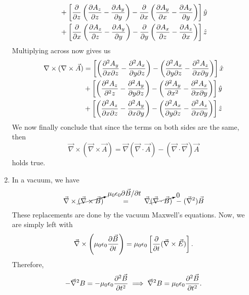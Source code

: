 \begin{sol}
\begin{enumerate}[label=\textbf{(\alph*)}]
\begin{align*}
    &+ \left[\pdv{}{z}\left(\pdv{A_z}{z} - \pdv{A_y}{y}\right) -\pdv{}{x}\left(\pdv{A_y}{x} - \pdv{A_x}{y}\right)\right]\hat{y} \\
    &+ \left[ \pdv{}{x}\left(\pdv{A_z}{z} - \pdv{A_y}{y}\right) - \pdv{}{y}\left(\pdv{A_x}{z} - \pdv{A_z}{x}\right) \right] \hat{z}
\end{align*}
Multiplying across now gives us 
\begin{align*}
    \nabla \times (\nabla \times \vec{A}) &= \left[\left(\pdv{^2 A_y}{x\partial z} - \pdv{^2 A_x}{y \partial z}\right) - \left(\pdv{^2 A_x}{y \partial z} - \pdv{^2 A_z}{x \partial y}\right)\right] \hat{x}\\
    &+ \left[\left(\pdv{^2 A_z}{^2 z} - \pdv{^2 A_y}{y \partial z}\right) -\left(\pdv{^2 A_y}{x^2} - \pdv{^2 A_x}{x \partial y}\right)\right]\hat{y} \\
    &+ \left[\left(\pdv{^2 A_z}{x \partial z} - \pdv{^2 A_y}{x \partial y}\right) - \left(\pdv{^2 A_x}{y \partial z} - \pdv{^2 A_z}{x \partial y}\right) \right] \hat{z}
\end{align*}
We now finally conclude that since the terms on both sides are the same, then 
\[\vec{\nabla}\times (\vec{\nabla} \times \vec{A}) = \vec{\nabla}(\vec{\nabla} \cdot \vec{A}) - (\vec{\nabla}\cdot \vec{\nabla}) \vec{A}\]
holds true.

\item In a vacuum, we have 
\[\vec{\nabla}\times\cancelto{\mu_0 \epsilon_0 \partial\vec{B}/\partial t}{(\vec{\nabla}\times\vec{B})}\;\;\;\;\;\;\;\;\;\;{=}\;\;\;\;\;\;\;\;\vec{\nabla}\cancelto{0}{(\vec{\nabla}\cdot\vec{B})}\;\;{-}\;(\vec{\nabla}^2)\vec{B}\]
These replacements are done by the vacuum Maxwell's equations. Now, we are simply left with 
\[\vec{\nabla}\times \left(\mu_0 \epsilon_0 \pdv{\vec{B}}{t}\right) = \mu_0 \epsilon_0\left[\frac{\partial}{\partial t} (\vec{\nabla}\times \vec{E})\right].\]
Therefore, 
\[-\vec{\nabla}^2 B = -\mu_0 \epsilon_0 \pdv{^2 \vec{B}}{t^2}\implies \vec{\nabla}^2 B = \mu_0 \epsilon_0 \pdv{^2 \vec{B}}{t^2}.\]
\end{enumerate}
\end{sol}